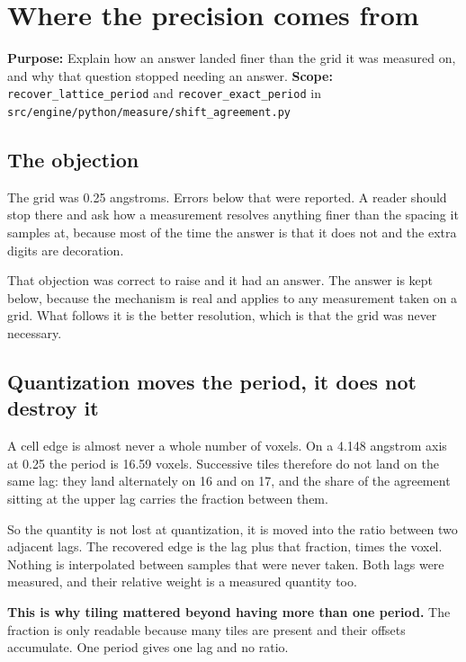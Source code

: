 \chapter{Where the precision comes from}

\textbf{Purpose:} Explain how an answer landed finer than the grid it was measured on, and why that question stopped needing an answer.
\textbf{Scope:} \texttt{recover\_\allowbreak{}lattice\_\allowbreak{}period} and \texttt{recover\_\allowbreak{}exact\_\allowbreak{}period} in \texttt{src/\allowbreak{}engine/\allowbreak{}python/\allowbreak{}measure/\allowbreak{}shift\_\allowbreak{}agreement.\allowbreak{}py}

\section{The objection}

The grid was 0.25 angstroms. Errors below that were reported. A reader should stop there and ask how a measurement resolves anything finer than the spacing it samples at, because most of the time the answer is that it does not and the extra digits are decoration.

That objection was correct to raise and it had an answer. The answer is kept below, because the mechanism is real and applies to any measurement taken on a grid. What follows it is the better resolution, which is that the grid was never necessary.

\section{Quantization moves the period, it does not destroy it}

A cell edge is almost never a whole number of voxels. On a 4.148 angstrom axis at 0.25 the period is 16.59 voxels. Successive tiles therefore do not land on the same lag: they land alternately on 16 and on 17, and the share of the agreement sitting at the upper lag carries the fraction between them.

So the quantity is not lost at quantization, it is moved into the ratio between two adjacent lags. The recovered edge is the lag plus that fraction, times the voxel. Nothing is interpolated between samples that were never taken. Both lags were measured, and their relative weight is a measured quantity too.

\textbf{This is why tiling mattered beyond having more than one period.} The fraction is only readable because many tiles are present and their offsets accumulate. One period gives one lag and no ratio.

